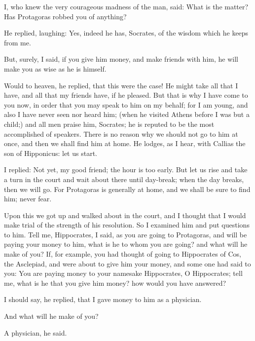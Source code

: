 \documentclass[11pt,letter]{article}
\begin{document}
\par  I, who knew the very courageous madness of the man, said: What is the matter? Has Protagoras robbed you of anything?

\par  He replied, laughing: Yes, indeed he has, Socrates, of the wisdom which he keeps from me.

\par  But, surely, I said, if you give him money, and make friends with him, he will make you as wise as he is himself.

\par  Would to heaven, he replied, that this were the case! He might take all that I have, and all that my friends have, if he pleased. But that is why I have come to you now, in order that you may speak to him on my behalf; for I am young, and also I have never seen nor heard him; (when he visited Athens before I was but a child;) and all men praise him, Socrates; he is reputed to be the most accomplished of speakers. There is no reason why we should not go to him at once, and then we shall find him at home. He lodges, as I hear, with Callias the son of Hipponicus: let us start.

\par  I replied: Not yet, my good friend; the hour is too early. But let us rise and take a turn in the court and wait about there until day-break; when the day breaks, then we will go. For Protagoras is generally at home, and we shall be sure to find him; never fear.

\par  Upon this we got up and walked about in the court, and I thought that I would make trial of the strength of his resolution. So I examined him and put questions to him. Tell me, Hippocrates, I said, as you are going to Protagoras, and will be paying your money to him, what is he to whom you are going? and what will he make of you? If, for example, you had thought of going to Hippocrates of Cos, the Asclepiad, and were about to give him your money, and some one had said to you: You are paying money to your namesake Hippocrates, O Hippocrates; tell me, what is he that you give him money? how would you have answered?

\par  I should say, he replied, that I gave money to him as a physician.

\par  And what will he make of you?

\par  A physician, he said.
\end{document}
